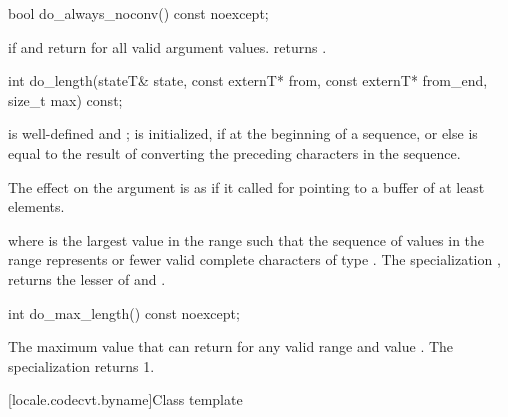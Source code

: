 %
\begin{itemdecl}
bool do_always_noconv() const noexcept;
\end{itemdecl}

\begin{itemdescr}
\pnum
\returns
{} if  and  return 
for all valid argument values.
 returns .
\end{itemdescr}

%
\begin{itemdecl}
int do_length(stateT& state, const externT* from, const externT* from_end, size_t max) const;
\end{itemdecl}

\begin{itemdescr}
\pnum
\expects
{} is well-defined and ;
 is initialized, if at the beginning of a sequence,
or else is equal to the result of converting
the preceding characters in the sequence.

\pnum
\effects
The effect on the  argument is as if
it called 
for  pointing to a buffer of at least  elements.

\pnum
\returns
{} where
 is the largest value in the range 
such that the sequence of values in the range 
represents
 or fewer valid complete characters of type .
The specialization ,
returns the lesser of  and .
\end{itemdescr}

%
\begin{itemdecl}
int do_max_length() const noexcept;
\end{itemdecl}

\begin{itemdescr}
\pnum
\returns
The maximum value that  can return
for any valid range 
and  value .
The specialization 
returns 1.
\end{itemdescr}

[locale.codecvt.byname]{Class template }

